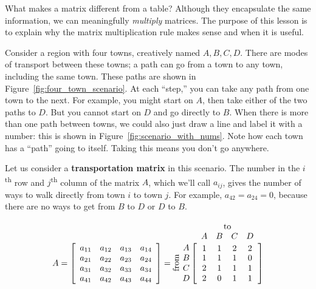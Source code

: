 \documentclass[../gatm.tex]{subfiles}
\begin{document}
What makes a matrix different from a table? Although they encapsulate the same information, we can meaningfully \textit{multiply} matrices. The purpose of this lesson is to explain why the matrix multiplication rule makes sense and when it is useful.

Consider a region with four towns, creatively named $A,B,C,D$. There are modes of transport between these towns; a path can go from a town to any town, including the same town. These paths are shown in Figure~\ref{fig:four_town_scenario}. At each ``step,'' you can take any path from one town to the next. For example, you might start on $A$, then take either of the two paths to $D$. But you cannot start on $D$ and go directly to $B$. When there is more than one path between towns, we could also just draw a line and label it with a number: this is shown in Figure~\ref{fig:scenario_with_nums}. Note how each town has a ``path'' going to itself. Taking this means you don't go anywhere.

Let us consider a \textbf{transportation matrix} in this scenario. The number in the $i$\textsuperscript{th} row and $j$\textsuperscript{th} column of the matrix $A$, which we'll call $a_{ij}$, gives the number of ways to walk directly from town $i$ to town $j$. For example, $a_{42} = a_{24} = 0$, because there are no ways to get from $B$ to $D$ or $D$ to $B$.

$$
  A = \left[\begin{array}{cccc}
  a_{11} & a_{12} & a_{13} & a_{14} \\
a_{21} & a_{22} & a_{23} & a_{24} \\
a_{31} & a_{32} & a_{33} & a_{34} \\
a_{41} & a_{42} & a_{43} & a_{44} \\
  \end{array}\right] =
  \rotatebox[origin=c]{90}{from}\;\,
  \begin{array}{@{}c@{}}
    \rowind{A} \\ \rowind{B} \\ \rowind{C} \\ \rowind{D}
  \end{array}
  \mathop{\left[
  \begin{array}{cccc}
     \colind{1}{A}  &  \colind{1}{B}  &  \colind{2}{C}  & \colind{2}{D} \\
1 & 1 & 1 & 0 \\
2 & 1 & 1 & 1 \\
2 & 0 & 1 & 1 \\
  \end{array}
  \right]}^{
  \begin{array}{@{}c@{}}
    \rowind{\text{to}} \\ \mathstrut
  \end{array}
  }
$$
\end{document}

